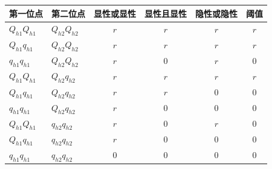 \begin{table}[htbp]
\centering
{}
\label{tab:ch03-07}
\small
\setlength{\tabcolsep}{10pt}
\begin{tabular}{llcccc}
\toprule
第一位点 & 第二位点 & 显性或显性 & 显性且显性 & 隐性或隐性 & 阈值\\
\midrule
$Q_{h1}Q_{h1}$ & $Q_{h2}Q_{h2}$ & $r$ & $r$ & $r$ & $r$\\
$Q_{h1}q_{h1}$ & $Q_{h2}Q_{h2}$ & $r$ & $r$ & $r$ & $r$\\
$q_{h1}q_{h1}$ & $Q_{h2}Q_{h2}$ & $r$ & $0$ & $r$ & $0$\\
$Q_{h1}Q_{h1}$ & $Q_{h2}q_{h2}$ & $r$ & $r$ & $r$ & $r$\\
$Q_{h1}q_{h1}$ & $Q_{h2}q_{h2}$ & $r$ & $r$ & $0$ & $0$\\
$q_{h1}q_{h1}$ & $Q_{h2}q_{h2}$ & $r$ & $0$ & $0$ & $0$\\
$Q_{h1}Q_{h1}$ & $q_{h2}q_{h2}$ & $r$ & $0$ & $r$ & $0$\\
$Q_{h1}q_{h1}$ & $q_{h2}q_{h2}$ & $r$ & $0$ & $0$ & $0$\\
$q_{h1}q_{h1}$ & $q_{h2}q_{h2}$ & $0$ & $0$ & $0$ & $0$\\
\bottomrule
\end{tabular}
\end{table}
